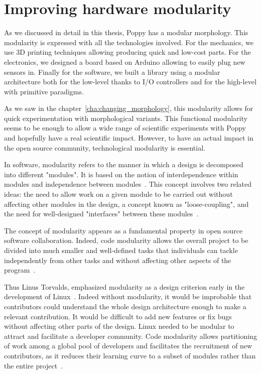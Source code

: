 \section{Improving hardware modularity} %
\label{sec:improve-hardware-modularity}

As we discussed in detail in this thesis, Poppy has a modular morphology. This modularity is expressed with all the technologies involved. For the mechanics, we use 3D printing techniques allowing producing quick and low-cost parts. For the electronics, we designed a board based on Arduino allowing to easily plug new sensors in. Finally for the software, we built a library using a modular architecture both for the low-level thanks to I/O controllers and for the high-level with primitive paradigms.

As we saw in the chapter~\ref{cha:changing_morphology}, this modularity allows for quick experimentation with morphological variants. This functional modularity seems to be enough to allow a wide range of scientific experiments with Poppy and hopefully have a real scientific impact. However, to have an actual impact in the open source community, technological modularity is essential.

In software, modularity refers to the manner in which a design is decomposed into different "modules". It is based on the notion of interdependence within modules and independence between modules~\parencite{baldwin2000design}. This concept involves two related ideas: the need to allow work on a given module to be carried out without affecting other modules in the design, a concept known as "loose-coupling", and the need for well-designed "interfaces" between these modules~\parencite{maccormack2006exploring}.

The concept of modularity appears as a fundamental property in open source software collaboration. Indeed, code modularity allows the overall project to be divided into much smaller and well-defined tasks that individuals can tackle independently from other tasks and without affecting other aspects of the program~\parencite{narduzzo2008modularity}.

Thus Linus Torvalds, emphasized modularity as a design criterion early in the development of Linux~\parencite{dibona1999open}. Indeed without modularity, it would be improbable that contributors could understand the whole design architecture enough to make a relevant contribution. It would be difficult to add new features or fix bugs without affecting other parts of the design. Linux needed to be modular to attract and facilitate a developer community. Code modularity allows partitioning of work among a global pool of developers and facilitates the recruitment of new contributors, as it reduces their learning curve to a subset of modules rather than the entire project~\parencite{fitzgerald2004critical}.

